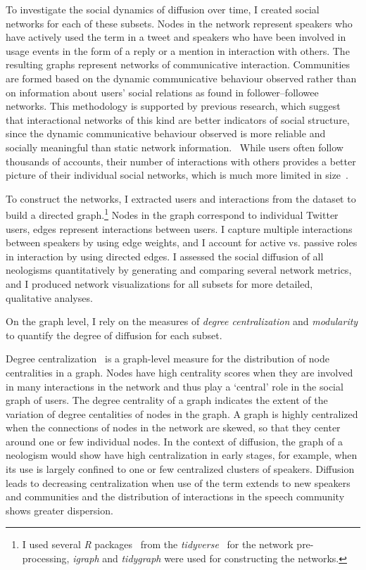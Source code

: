 \documentclass[
  a4paper,
  abstract=on,
  captions=tableabove
  ]{scrartcl}
\begin{document}
  To investigate the social dynamics of diffusion over time, I created social networks for each of these subsets. Nodes in the network represent speakers who have actively used the term in a tweet and speakers who have been involved in usage events in the form of a reply or a mention in interaction with others. The resulting graphs represent networks of communicative interaction. Communities are formed based on the dynamic communicative behaviour observed rather than on information about users' social relations as found in follower--followee networks. This methodology is supported by previous research, which suggest that interactional networks of this kind are better indicators of social structure, since the dynamic communicative behaviour observed is more reliable and socially meaningful than static network information.~\parencite{Goel2016SocialDynamics, Huberman2008SocialNetworks} While users often follow thousands of accounts, their number of interactions with others provides a better picture of their individual social networks, which is much more limited in size~\parencite{Dunbar1992NeocortexSize}.

  To construct the networks, I extracted users and interactions from the dataset to build a directed graph.\footnote{I used several \emph{R} packages~\parencite{RCoreTeam2018LanguageEnvironment} from the \emph{tidyverse}~\parencite{Wickham2019WelcomeTidyverse} for the network pre-processing, \emph{igraph} and \emph{tidygraph} were used for constructing the networks.} Nodes in the graph correspond to individual Twitter users, edges represent interactions between users. I capture multiple interactions between speakers by using edge weights, and I account for active vs. passive roles in interaction by using directed edges. I assessed the social diffusion of all neologisms quantitatively by generating and comparing several network metrics, and I produced network visualizations for all subsets for more detailed, qualitative analyses.

  On the graph level, I rely on the measures of \emph{degree centralization} and \emph{modularity} to quantify the degree of diffusion for each subset.

  Degree centralization~\parencite{Freeman1978CentralitySocial} is a graph-level measure for the distribution of node centralities in a graph. Nodes have high centrality scores when they are involved in many interactions in the network and thus play a `central' role in the social graph of users. The degree centrality of a graph indicates the extent of the variation of degree centalities of nodes in the graph. A graph is highly centralized when the connections of nodes in the network are skewed, so that they center around one or few individual nodes. In the context of diffusion, the graph of a neologism would show have high centralization in early stages, for example, when its use is largely confined to one or few centralized clusters of speakers. Diffusion leads to decreasing centralization when use of the term extends to new speakers and communities and the distribution of interactions in the speech community shows greater dispersion.
\end{document}
